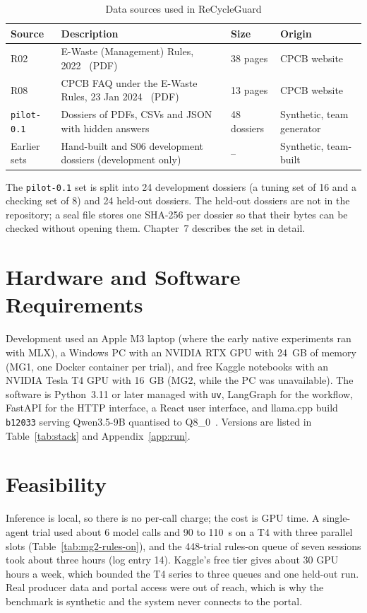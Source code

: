 \begin{table}[htbp]
\centering
\caption{Data sources used in ReCycleGuard}
\label{tab:data}
\small
\begin{tabularx}{\linewidth}{@{}l X l l@{}}
\toprule
\textbf{Source} & \textbf{Description} & \textbf{Size} & \textbf{Origin} \\ \midrule
R02 & E-Waste (Management) Rules, 2022~\cite{rules2022} (PDF) & 38 pages & CPCB website \\
R08 & CPCB FAQ under the E-Waste Rules, 23 Jan 2024~\cite{faq2024} (PDF) & 13 pages & CPCB website \\
\texttt{pilot-0.1} & Dossiers of PDFs, CSVs and JSON with hidden answers & 48 dossiers & Synthetic, team generator \\
Earlier sets & Hand-built and S06 development dossiers (development only) & -- & Synthetic, team-built \\
\bottomrule
\end{tabularx}
\end{table}

The \texttt{pilot-0.1} set is split into 24 development dossiers (a tuning set of 16 and a
checking set of 8) and 24 held-out dossiers. The held-out dossiers are not in the repository; a
seal file stores one SHA-256 per dossier so that their bytes can be checked without opening them.
Chapter~7 describes the set in detail.

\section{Hardware and Software Requirements}
Development used an Apple M3 laptop (where the early native experiments ran with MLX), a Windows
PC with an NVIDIA RTX GPU with 24~GB of memory (MG1, one Docker container per trial), and free
Kaggle notebooks with an NVIDIA Tesla T4 GPU with 16~GB (MG2, while the PC was unavailable). The
software is Python~3.11 or later managed with \texttt{uv}, LangGraph for the workflow, FastAPI for
the HTTP interface, a React user interface, and llama.cpp build \texttt{b12033} serving
Qwen3.5-9B quantised to Q8\_0~\cite{qwen35gguf,llamacpp}. Versions are listed in
Table~\ref{tab:stack} and Appendix~\ref{app:run}.

\section{Feasibility}
Inference is local, so there is no per-call charge; the cost is GPU time. A single-agent trial
used about 6 model calls and 90 to 110~s on a T4 with three parallel slots (Table~\ref{tab:mg2-rules-on}),
and the 448-trial rules-on queue of seven sessions took about three hours (log entry 14). Kaggle's free tier gives about 30 GPU
hours a week, which bounded the T4 series to three queues and one held-out run. Real producer data
and portal access were out of reach, which is why the benchmark is synthetic and the system never
connects to the portal.
